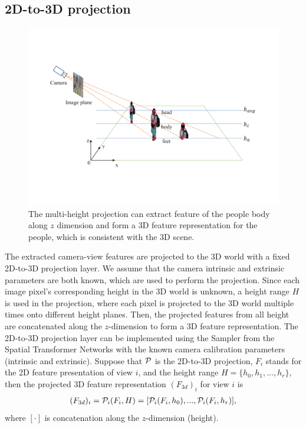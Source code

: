 \documentclass[letterpaper]{article}
\newcommand{\citep}{\cite}
\begin{document}
\subsection{2D-to-3D projection}


\begin{figure}[t]
\centering
   \includegraphics[width=0.95\columnwidth]{Fig_3dprojection.pdf}
   \caption{
   The multi-height projection can extract feature of the people body along $z$ dimension and form a 3D feature representation for the people, which is consistent with the 3D scene. }
\label{fig:3dprojection}
\end{figure}



\par
The extracted camera-view features are projected to the 3D world with a fixed 2D-to-3D projection layer. We assume that the camera intrinsic and extrinsic parameters are both known, which are used to perform the projection. Since each image pixel's corresponding height in the 3D world is unknown, a height range $H$
is used in the projection, where each pixel is projected to the 3D world multiple times onto different height planes. Then, the projected features from all height are concatenated along the $z$-dimension %
to form a 3D feature representation.
The 2D-to-3D projection layer can be implemented using the Sampler from the Spatial Transformer Networks \citep{Jaderberg2015Spatial} with the known camera calibration parameters (intrinsic and extrinsic).
Suppose that $\cal P$ is the 2D-to-3D projection, $F_i$ stands for the 2D feature presentation of view $i$, and the height range $H = \{h_0, h_1, ..., h_r\}$, then the projected 3D feature representation $(F_{3d})_i$ for view $i$ is
\begin{align}
  (F_{3d})_i = {{\cal P}_i} (F_i, H)
             = [{{\cal P}_i} (F_i, h_0), ..., {{\cal P}_i} (F_i, h_r)] ,
\end{align}
where $[\cdot]$ is concatenation %
along the $z$-dimension (height).
\end{document}
